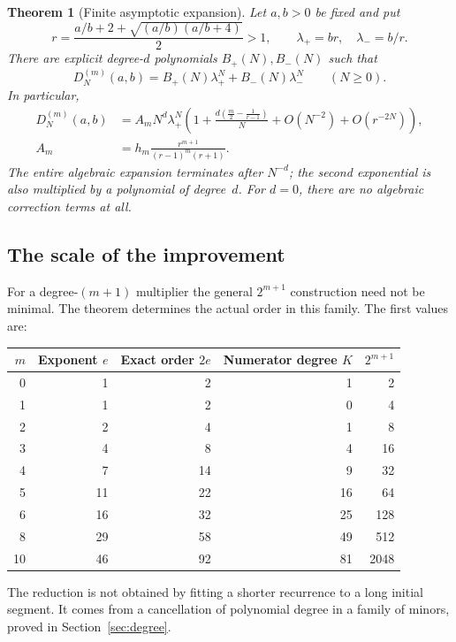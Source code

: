 \documentclass[11pt,a4paper]{article}
\numberwithin{equation}{section}
\newtheorem{theorem}{Theorem}[section]
\theoremstyle{definition}
\theoremstyle{remark}
\newcommand{\D}[2]{D_{#1}^{(#2)}}
\begin{document}
\begin{theorem}[Finite asymptotic expansion]\label{thm:asymp}
Let $a,b>0$ be fixed and put
\begin{equation}\label{eq:positive-roots}
 r=\frac{a/b+2+\sqrt{(a/b)(a/b+4)}}2>1,\qquad
 \lambda_+=br,\quad \lambda_-=b/r.
\end{equation}
There are explicit degree-$d$ polynomials $B_+(N),B_-(N)$ such that
\begin{equation}\label{eq:two-exp-statement}
 \D{N}{m}(a,b)=B_+(N)\lambda_+^N+B_-(N)\lambda_-^N
 \qquad(N\geq0).
\end{equation}
In particular,
\begin{align}
 \D{N}{m}(a,b)
 &=A_m N^d\lambda_+^N
 \left(1+\frac{d\left(\frac m2-\frac1{r-1}\right)}{N}
       +O(N^{-2})+O(r^{-2N})\right),\label{eq:asymp}\\
 A_m&=h_m\frac{r^{m+1}}{(r-1)^m(r+1)}.\label{eq:A}
\end{align}
The entire algebraic expansion terminates after $N^{-d}$; the second
exponential is also multiplied by a polynomial of degree~$d$.
For $d=0$, there are no algebraic correction terms at all.
\end{theorem}

\subsection{The scale of the improvement}
For a degree-$(m+1)$ multiplier the general $2^{m+1}$ construction need
not be minimal.  The theorem determines the actual order in this family.
The first values are:
\begin{center}
\renewcommand{\arraystretch}{1.12}
\begin{tabular}{@{}rrrrr@{}}
\toprule
$m$ & Exponent $e$ & Exact order $2e$ & Numerator degree $K$ & $2^{m+1}$\\
\midrule
0 & 1 & 2 & 1 & 2\\
1 & 1 & 2 & 0 & 4\\
2 & 2 & 4 & 1 & 8\\
3 & 4 & 8 & 4 & 16\\
4 & 7 & 14 & 9 & 32\\
5 & 11 & 22 & 16 & 64\\
6 & 16 & 32 & 25 & 128\\
8 & 29 & 58 & 49 & 512\\
10 & 46 & 92 & 81 & 2048\\
\bottomrule
\end{tabular}
\end{center}
The reduction is not obtained by fitting a shorter recurrence to a long
initial segment.  It comes from a cancellation of polynomial degree in a
family of minors, proved in Section~\ref{sec:degree}.
\end{document}

